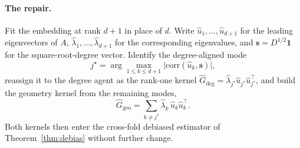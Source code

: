 \documentclass[12pt]{article}
\newcommand{\1}{\mathbf{1}}
\begin{document}
\paragraph{The repair.} Fit the embedding at rank $d{+}1$ in place of $d$. Write $\widehat u_1,\dots,\widehat u_{d+1}$ for the leading eigenvectors of $A$, $\widehat\lambda_1,\dots,\widehat\lambda_{d+1}$ for the corresponding eigenvalues, and $\mathbf s=D^{1/2}\mathbf 1$ for the square-root-degree vector. Identify the degree-aligned mode
\[
j^\star=\arg\max_{1\le k\le d+1}\bigl|\mathrm{corr}(\widehat u_k,\mathbf s)\bigr|,
\]
reassign it to the degree agent as the rank-one kernel $\widehat G_{\deg}=\widehat\lambda_{j^\star}\widehat u_{j^\star}\widehat u_{j^\star}^\top$, and build the geometry kernel from the remaining modes,
\[
\widehat G_{\mathrm{geo}}=\sum_{k\ne j^\star}\widehat\lambda_k\,\widehat u_k\widehat u_k^\top.
\]
Both kernels then enter the cross-fold debiased estimator of Theorem~\ref{thm:debias} without further change.
\end{document}
